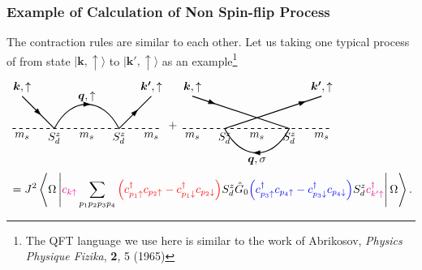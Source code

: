 \documentclass[10pt,aspectratio=43,xcolor=x11names,t]{beamer}%
\begin{document}
		\begin{frame}\frametitle{Example of Calculation of Non Spin-flip Process}
			The contraction rules are similar to each other. Let us taking one typical process of from state $|\bm{k},\uparrow\rangle$ to $|\bm{k'},\uparrow\rangle$ as an example\footnote{The QFT language we use here is similar to the work of Abrikosov, \textit{Physics Physique Fizika}, \textbf{2}, 5 (1965)}
			\begin{align*}
				&\begin{tikzpicture}[baseline]
					\draw[thick,dashed] (-2.3,0)--(2.3,0);
					\draw[thick] (-2,1)--(-1,0) .. controls (-0.5,1) and (0.5,1) ..(1,0)--(2,1);
					\node[below] at (2,0) {$m_s$};
					\node[below] at (-2,0) {$m_s$};
					\node[below] at (0,0) {$m_s$};
					\node[below] at (1,0) {$S_d^z$};
					\node[below] at (-1,0) {$S_d^z$};
					\node[rotate=-45] at (-1.5,0.5) {\arrow};
					\node at (0,0.75) {\arrow};
					\node at (0,1) {$\bm{q},\uparrow$};
					\node[above] at (-2,1) {$\bm{k},\uparrow$};
					\node[above] at (2,1) {$\bm{k'},\uparrow$};
					\node[rotate=45] at (1.5,0.5) {\arrow};
				\end{tikzpicture}+\begin{tikzpicture}[baseline]
					\draw[thick,dashed] (-2.3,0)--(2.3,0);
					\draw[thick] (-2,1)--(1,0) .. controls (0.5,-1) and (-0.5,-1) .. (-1,0)--(2,1);
					\node[below] at (2,0) {$m_s$};
					\node[below] at (-2,0) {$m_s$};
					\node[below] at (0,0) {$m_s$};
					\node[below] at (1,0) {$S_d^z$};
					\node[below] at (-1,0) {$S_d^z$};
					\node[rotate=-20] at (-1.4,0.8) {\arrow};
					\node[rotate=180] at (0,-0.75) {\arrow};
					\node at (0,-1) {$\bm{q},\sigma$};
					\node[above] at (-2,1) {$\bm{k},\uparrow$};
					\node[above] at (2,1) {$\bm{k'},\uparrow$};
					\node[rotate=20] at (1.4,0.8) {\arrow};
				\end{tikzpicture}\\
				&=J^2\left\langle\Omega\left|{\color{magenta}c_{k\uparrow}}\sum_{p_1p_2p_3p_4}{\color{red}\left(c_{p_1\uparrow}^\dagger c_{p_2\uparrow}-c_{p_1\downarrow}^\dagger c_{p_2\downarrow}\right)}S_d^z \hat{G}_0{\color{blue}\left(c_{p_3\uparrow}^\dagger c_{p_4\uparrow}-c_{p_3\downarrow}^\dagger c_{p_4\downarrow}\right)}S_d^z{\color{magenta}c_{k'\uparrow}^\dagger}\right|\Omega\right\rangle.
			\end{align*}
		\end{frame}
\end{document}
